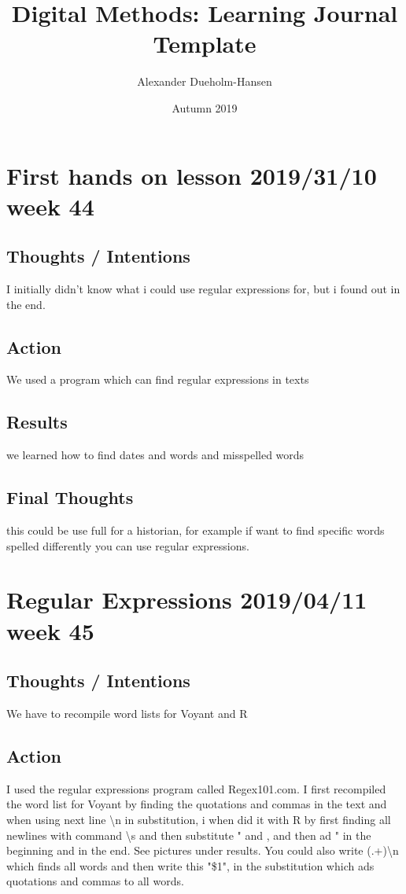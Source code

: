 \documentclass{article}
\title{Digital Methods: Learning Journal Template}
\author{Alexander Dueholm-Hansen}
\date{Autumn 2019}
\begin{document}
\maketitle

\section{First hands on lesson 2019/31/10 week 44}
\subsection{Thoughts / Intentions} I initially didn't know what i could use regular expressions for, but i found out in the end. 
\subsection{Action} We used a program which can find regular expressions in texts
\subsection{Results} we learned how to find dates and words and misspelled words
\subsection{Final Thoughts} this could be use full for a historian, for example if want to find specific words spelled differently you can use regular expressions. 

\pagebreak{}


\section{Regular Expressions 2019/04/11 week 45}
\subsection{Thoughts / Intentions} We have to recompile word lists for Voyant and R
\subsection{Action} I used the regular expressions program called Regex101.com. I first recompiled the word list for Voyant by finding the quotations and commas in the text and when using next line \textbackslash n in substitution, i when did it with R by first finding all newlines with command \textbackslash s and then substitute " and , and then ad " in the beginning and in the end. See pictures under results. You could also write (.+)\textbackslash n which finds all words and then write this "\$1", in the substitution which ads quotations and commas to all words.
\end{document}
